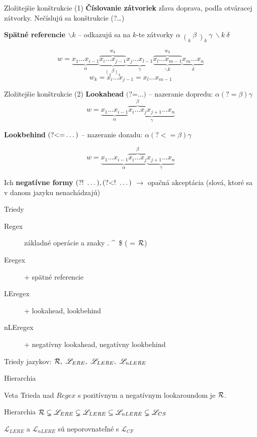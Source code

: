 \documentclass[mathserif]{beamer}
\def\R{{\cal R}} %
\def\L{\mathscr{L}} %
\def\re{Regex}
\def\el{\mathscr{L}_{ERE}}
\def\lel{\mathscr{L}_{LERE}}
\def\nlel{\mathscr{L}_{nLERE}}
\def\lookahead{\text{(?=}}
\def\nlookahead{\text{(?!~}}
\def\lookbehind{\text{(?\textless =}}
\def\nlookbehind{\text{(?\textless !~}}
\begin{document}
\begin{frame}{Zložitejšie konštrukcie (1)}
\textbf{Číslovanie zátvoriek} zľava doprava, podľa otváracej zátvorky. Nečíslujú sa konštrukcie (?\dots)

\vspace{20pt}
\textbf{Spätné referencie $\backslash k$} -- odkazujú sa na $k$-te zátvorky
$\displaystyle \alpha~ \mathop(_k ~\beta ~\mathop)_k ~\gamma ~\backslash k ~\delta$

$$w = \underbrace{x_1\dots x_{i-1}}_\alpha 
 \overbrace{\underbrace{x_i\dots x_{j-1}}_{ \displaystyle{\mathop(_k\beta \mathop)_k}}}^{w_k} 
 \underbrace{x_j\dots x_{l-1}}_\gamma 
 \overbrace{\underbrace{x_l\dots x_{m-1}}_{\backslash k}}^{w_k}
 \underbrace{x_{m}\dots x_{n}}_\delta$$
\vspace{10pt} 
$$ w_k = x_i\dots x_{j-1} = x_l\dots x_{m-1} $$

\end{frame}
\begin{frame}{Zložitejšie konštrukcie (2)}
\textbf{Lookahead} $\lookahead\dots)$ -- nazeranie dopredu:
$\alpha(?=\beta)\gamma$ $$w = \underbrace{x_1\dots x_{i-1}}_\alpha \underbrace{\overbrace{x_i \dots x_j}^\beta x_{j+1} \dots x_n }_\gamma$$ 

\textbf{Lookbehind} $\lookbehind\dots)$ -- nazeranie dozadu: $\alpha(?<=\beta)\gamma$

$$w = \underbrace{x_1\dots x_{i-1} \overbrace{x_i \dots x_j}^\beta}_\alpha \underbrace{x_{j+1} \dots x_n }_\gamma$$

Ich \textbf{negatívne formy} $\nlookahead\dots),\nlookbehind\dots)$ $\rightarrow$ opačná akceptácia (slová, ktoré sa v danom jazyku nenachádzajú)
\end{frame}

\begin{frame}{Triedy}
\begin{description}
\item[Regex] základné operácie a znaky . \textasciicircum ~\$ ( = $\R$)
\item[Eregex] + spätné referencie
\item[LEregex] + lookahead, lookbehind
\item[nLEregex] + negatívny lookahead, negatívny lookbehind
\end{description}
\vspace{30pt}
Triedy jazykov: $\R,~\el,~\lel,~\nlel$
\end{frame}

\begin{frame}{Hierarchia}
\begin{block}{Veta}
Trieda nad $\re$ s pozitívnym a negatívnym lookaroundom je $\R$.
\end{block}

\vspace{15pt}

\begin{block}{Hierarchia}
$\R \subsetneq \el \subsetneq \lel \subseteq \nlel \subsetneq \L_{CS}$
\end{block}
\begin{block}{}
$\lel$ a $\nlel$ sú neporovnateľné s $\L_{CF}$
\end{block}

\end{frame}
\end{document}
